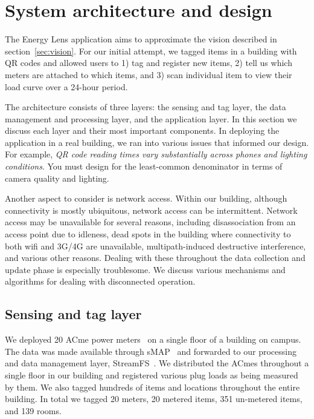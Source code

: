 \section{System architecture and design}
The Energy Lens application aims to approximate the vision described in section~\ref{sec:vision}.  For our initial
attempt, we tagged items in a building with QR codes and allowed users to 1) tag and register new items, 
2) tell us which meters are attached to which items, and 3) scan individual item to view their load curve over a 
24-hour period.

The architecture consists of three layers: the sensing and tag layer, the data management and processing layer, and the application
layer.  In this section we discuss each layer and their most important components.  In deploying the application in a real building, 
we ran into various issues that informed our design.  For example, \emph{QR code reading times vary substantially across phones
and lighting conditions}.  You must design for the least-common denominator in terms of camera quality and lighting.

Another aspect to consider is network access.  Within our building, although connectivity is mostly ubiquitous, network
access can be intermittent.  Network access may be unavailable for several reasons, including disassociation from an access point due
to idleness, dead spots in the building where connectivity to both wifi and 3G/4G are unavailable, multipath-induced
destructive interference, and various other reasons.  Dealing with these throughout the data collection and update phase is
especially troublesome.  We discuss various mechanisms and algorithms for dealing with disconnected operation.





\subsection{Sensing and tag layer}
We deployed 20 ACme power meters~\cite{acme} on a single floor of a building on campus.  The data was made available through
sMAP~\cite{smap} and forwarded to our processing and data management layer, StreamFS~\cite{streamfs}.  We distributed
the ACmes throughout a single floor in our building and registered various plug loads as being measured by them.  We also tagged
hundreds of items and locations throughout the entire building.  In total we tagged 20 meters, 20 metered items, 351 un-metered items,
 and 139 rooms.






